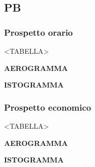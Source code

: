 \subsection{PB}

\subsubsection{Prospetto orario}

<TABELLA>


\textbf{AEROGRAMMA}


\textbf{ISTOGRAMMA}

\subsubsection{Prospetto economico}

<TABELLA>


\textbf{AEROGRAMMA}


\textbf{ISTOGRAMMA}

